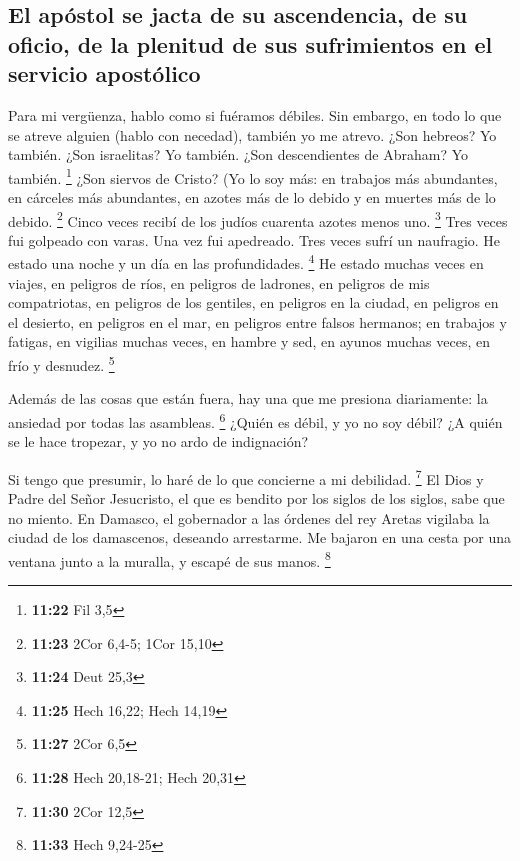 \begin{paracol}{2}
{\subsection{El apóstol se jacta de su ascendencia, de su oficio, de la
plenitud de sus sufrimientos en el servicio
apostólico}\label{el-apuxf3stol-se-jacta-de-su-ascendencia-de-su-oficio-de-la-plenitud-de-sus-sufrimientos-en-el-servicio-apostuxf3lico}}

 Para mi vergüenza, hablo como si fuéramos débiles. Sin
embargo, en todo lo que se atreve alguien (hablo con necedad), también
yo me atrevo.  ¿Son hebreos? Yo también. ¿Son israelitas?
Yo también. ¿Son descendientes de Abraham? Yo también. \footnote{\textbf{11:22}
  Fil 3,5}  ¿Son siervos de Cristo? (Yo lo soy más: en
trabajos más abundantes, en cárceles más abundantes, en azotes más de lo
debido y en muertes más de lo debido. \footnote{\textbf{11:23} 2Cor
  6,4-5; 1Cor 15,10}  Cinco veces recibí de los judíos
cuarenta azotes menos uno. \footnote{\textbf{11:24} Deut 25,3}
 Tres veces fui golpeado con varas. Una vez fui
apedreado. Tres veces sufrí un naufragio. He estado una noche y un día
en las profundidades. \footnote{\textbf{11:25} Hech 16,22; Hech 14,19}
 He estado muchas veces en viajes, en peligros de ríos,
en peligros de ladrones, en peligros de mis compatriotas, en peligros de
los gentiles, en peligros en la ciudad, en peligros en el desierto, en
peligros en el mar, en peligros entre falsos hermanos; 
en trabajos y fatigas, en vigilias muchas veces, en hambre y sed, en
ayunos muchas veces, en frío y desnudez. \footnote{\textbf{11:27} 2Cor
  6,5}

 Además de las cosas que están fuera, hay una que me
presiona diariamente: la ansiedad por todas las asambleas. \footnote{\textbf{11:28}
  Hech 20,18-21; Hech 20,31}  ¿Quién es débil, y yo no
soy débil? ¿A quién se le hace tropezar, y yo no ardo de indignación?

 Si tengo que presumir, lo haré de lo que concierne a mi
debilidad. \footnote{\textbf{11:30} 2Cor 12,5}  El Dios y
Padre del Señor Jesucristo, el que es bendito por los siglos de los
siglos, sabe que no miento.  En Damasco, el gobernador a
las órdenes del rey Aretas vigilaba la ciudad de los damascenos,
deseando arrestarme.  Me bajaron en una cesta por una
ventana junto a la muralla, y escapé de sus manos. \footnote{\textbf{11:33}
  Hech 9,24-25}


\end{paracol}
